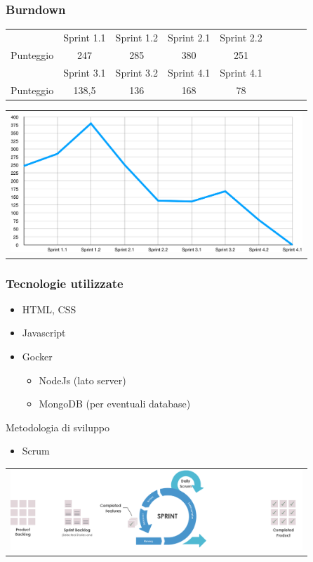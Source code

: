 \documentclass{beamer}
\begin{document}
\begin{frame}
\frametitle{Burndown}
\centering
\begin{tabular}{|c|c|c|c|c|c|c|c|c|}
\hline
					& Sprint 1.1	& Sprint 1.2	&Sprint 2.1	&Sprint 2.2	\\
Punteggio		& 247			& 285			& 380			& 251			\\
\hline
					&Sprint 3.1	&Sprint 3.2	&Sprint 4.1	&Sprint 4.1    \\
Punteggio 	& 138,5			& 136			& 168			& 78 			 	 \\
\hline
\end{tabular}
 \centering
        \begin{tabular}{c}
        \includegraphics[width=11cm]{burndown/burndown_slides.png}
      \end{tabular}
\end{frame}

\begin{frame}
\frametitle{Tecnologie utilizzate}
\begin{itemize}
  \item HTML, CSS
  \item Javascript
  \item Gocker
  \begin{itemize}
  \item NodeJs (lato server)
  \item MongoDB (per eventuali database)
\end{itemize}
\end{itemize}
Metodologia di sviluppo
  \begin{itemize}
  \item Scrum
\end{itemize}
      \centering  \begin{tabular}{c}
        \includegraphics[width=11cm]{Images/scrum/scrum-sprint}
      \end{tabular}
\end{frame}
\end{document}
